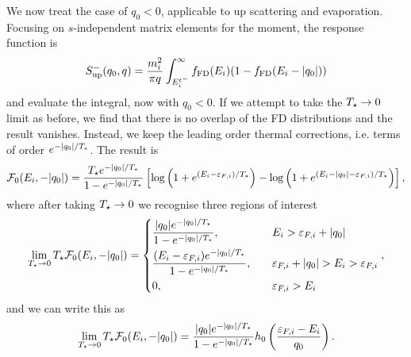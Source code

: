 We now treat the case of $q_0<0$, applicable to up scattering and evaporation. Focusing on $s$-independent matrix elements for the moment, the response function is
\begin{equation}
    S^{-}_\mathrm{up}(q_0, q) = \frac{m_i^2}{\pi q}\int_{E_i^{t^-}}^\infty f_{\rm FD}(E_i)(1 - f_{\rm FD}(E_i -|q_0|))
\end{equation}
and evaluate the integral, now with $q_0 <0$. If we attempt to take the $T_\star\rightarrow 0$ limit as before, we find that there is no overlap of the FD distributions and the result vanishes. Instead, we keep the leading order thermal corrections, i.e. terms of order $e^{-|q_0|/T_\star}$. The result is 
\begin{equation}
        \mathcal{F}_0(E_i, -|q_0|) = \frac{T_\star e^{-|q_0|/T_\star}}{1 - e^{-|q_0|/T_\star}} \left[ \log\left( 1 + e^{(E_i-\varepsilon_{F,i})/T_\star}\right) - \log\left( 1 + e^{(E_i-|q_0|-\varepsilon_{F,i})/T_\star}\right)\right],
\end{equation}
where after taking $T_\star \rightarrow 0$ we recognise three regions of interest
\begin{equation}
    \lim_{T_\star \rightarrow 0}T_\star \mathcal{F}_0(E_i, -|q_0|) = 
    \begin{dcases}
        \frac{|q_0| e^{-|q_0|/T_\star}}{1 - e^{-|q_0|/T_\star}},&\quad E_i>\varepsilon_{F,i} +|q_0|\\  
        \frac{(E_i-\varepsilon_{F,i}) e^{-|q_0|/T_\star}}{1 - e^{-|q_0|/T_\star}},&\quad \varepsilon_{F,i} + |q_0| > E_i > \varepsilon_{F,i}\\
        0, & \quad \varepsilon_{F,i}>E_i
    \end{dcases},
\end{equation}
and we can write this as
\begin{equation}
    \lim_{T_\star \rightarrow 0}T_\star \mathcal{F}_0(E_i, -|q_0|) = \frac{|q_0| e^{-|q_0|/T_\star}}{1 - e^{-|q_0|/T_\star}}h_0\left(\frac{\varepsilon_{F,i} - E_i}{q_0}\right).
\end{equation}

